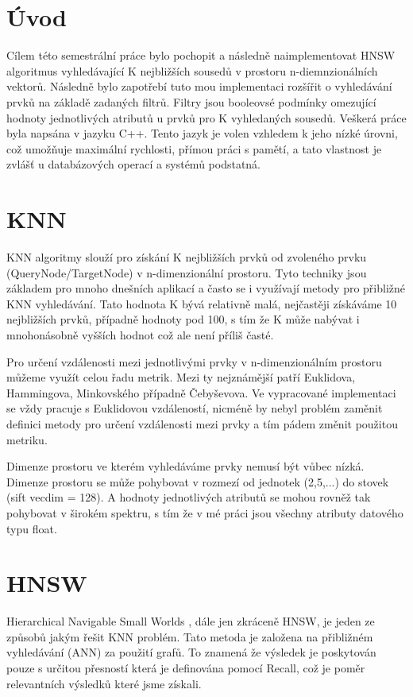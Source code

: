 \documentclass[czech,semestral,dept460,male,csharp,cpdeclaration]{diploma}
\begin{document}
	
	\MakeTitlePages
	
	\chapter{Úvod}
	
		Cílem této semestrální práce bylo pochopit a následně naimplementovat HNSW algoritmus vyhledávající K nejbližších sousedů v prostoru n-diemnzionálních vektorů. Následně bylo zapotřebí tuto mou implementaci rozšířit o vyhledávání prvků na základě zadaných filtrů. Filtry jsou booleovsé podmínky omezující hodnoty jednotlivých atributů u prvků pro K vyhledaných sousedů. Veškerá práce byla napsána v jazyku C++. Tento jazyk je volen vzhledem k jeho nízké úrovni, což umožňuje maximální rychlosti, přímou práci s pamětí, a tato vlastnost je zvlášť u databázových operací a systémů podstatná.
	
	\chapter{KNN}
	
		KNN algoritmy slouží pro získání K nejbližších prvků od zvoleného prvku (QueryNode/TargetNode) v n-dimenzionální prostoru. Tyto techniky jsou základem pro mnoho dnešních aplikací a často se i využívají metody pro přibližné KNN vyhledávání. Tato hodnota K bývá relativně malá, nejčastěji získáváme 10 nejbližších prvků, případně hodnoty pod 100, s tím že K může nabývat i mnohonásobně vyšších hodnot což ale není příliš časté.
		
		Pro určení vzdálenosti mezi jednotlivými prvky v n-dimenzionálním prostoru můžeme využít celou řadu metrik. Mezi ty nejznámější patří Euklidova, Hammingova, Minkovského případně Čebyševova. Ve vypracované implementaci se vždy pracuje s Euklidovou vzdáleností, nicméně by nebyl problém zaměnit definici metody pro určení vzdálenosti mezi prvky a tím pádem změnit použitou metriku.
		
		Dimenze prostoru ve kterém vyhledáváme prvky nemusí být vůbec nízká. Dimenze prostoru se může pohybovat v rozmezí od jednotek (2,5,...) do stovek (sift vecdim = 128). A hodnoty jednotlivých atributů se mohou rovněž tak pohybovat v širokém spektru, s tím že v mé práci jsou všechny atributy datového typu float.
	
	\chapter{HNSW}
	
		Hierarchical Navigable Small Worlds \cite{malkov2018efficient}, dále jen zkráceně HNSW, je jeden ze způsobů jakým řešit KNN problém. Tato metoda je založena na přibližném vyhledávání (ANN) za použití grafů. To znamená že výsledek je poskytován pouze s určitou přesností která je definována pomocí Recall, což je poměr relevantních výsledků které jsme získali.
		
\end{document}
